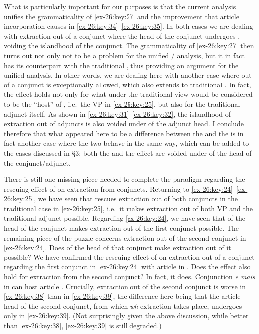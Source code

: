 \documentclass[output=paper]{langsci/langscibook}
\begin{document}
What is particularly important for our purposes is that the current analysis
unifies the grammaticality of \eqref{ex-26:key:27} and the improvement that article
incorporation causes in \eqref{ex-26:key:34}--\eqref{ex-26:key:35}. In both cases we are dealing with
extraction out of a conjunct where the head of the conjunct undergoes ,
voiding the islandhood of the conjunct. The grammaticality of \eqref{ex-26:key:27} then turns
out not only not to be a problem for the unified / analysis,
but it in fact has its counterpart with the traditional , thus
providing an argument for the unified analysis. In other words, we are dealing
here with another case where  out of a conjunct is exceptionally
allowed, which also extends to traditional . In fact, the effect
holds not only for what under the traditional view would be considered to be
the \enquote{host} of , i.e.\ the VP in \eqref{ex-26:key:25}, but also for the
traditional adjunct itself.  As shown in \eqref{ex-26:key:31}--\eqref{ex-26:key:32}, the islandhood
of extraction out of adjuncts is also voided under  of
the adjunct head. I conclude therefore that what appeared here to be a
difference between the  and the  is in fact another case where the two behave in the same way, which
can be added to the cases discussed in §3: both the  and the
 effect are voided under  of the head of the conjunct/adjunct.\newpage

There is still one missing piece needed to complete the paradigm regarding the
rescuing effect of  on extraction from conjuncts. Returning to
\eqref{ex-26:key:24}--\eqref{ex-26:key:25}, we have seen that  rescues extraction out of both
conjuncts in the traditional  case in \eqref{ex-26:key:25}, i.e.\ it makes extraction
out of both VP and the traditional adjunct possible. Regarding \eqref{ex-26:key:24}, we have
seen that  of the head of the conjunct makes extraction out of the
first conjunct possible. The remaining piece of the puzzle concerns extraction
out of the second conjunct in \eqref{ex-26:key:24}. Does  of the head of that
conjunct make extraction out of it possible? We have confirmed the rescuing
effect of  on extraction out of a conjunct regarding the first
conjunct in \eqref{ex-26:key:24} with article  in . Does the effect also
hold for extraction from the second conjunct? In fact, it does. Conjunction
\emph{e mais} in  can host article . Crucially, extraction
out of the second conjunct is worse in \eqref{ex-26:key:38} than in \eqref{ex-26:key:39}, the difference here
being that the article head of the second conjunct, from which
\emph{wh}-extraction takes place, undergoes  only in \eqref{ex-26:key:39}. (Not
surprisingly given the above discussion, while better than \eqref{ex-26:key:38}, \eqref{ex-26:key:39} is still
degraded.)
\end{document}
